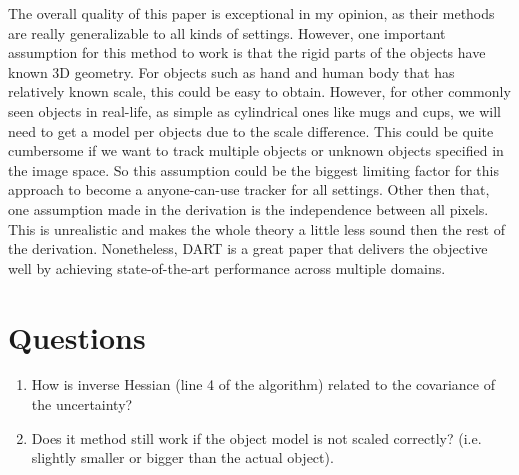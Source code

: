 \documentclass[10pt, twocolumn]{article}
\begin{document}
The overall quality of this paper is exceptional in my opinion, as their methods
are really generalizable to all kinds of settings. However, one important
assumption for this method to work is that the rigid parts of the objects have
known 3D geometry. For objects such as hand and human body that has relatively
known scale, this could be easy to obtain. However, for other commonly seen
objects in real-life, as simple as cylindrical ones like mugs and cups, we will
need to get a model per objects due to the scale difference. This could be
quite cumbersome if we want to track multiple objects or unknown objects
specified in the image space. So this assumption could be the biggest limiting
factor for this approach to become a anyone-can-use tracker for all settings.
Other then that, one assumption made in the derivation is the independence
between all pixels. This is unrealistic and makes the whole theory a little
less sound then the rest of the derivation. Nonetheless, DART is a great
paper that delivers the objective well by achieving state-of-the-art performance
across multiple domains.

\section{Questions}
\begin{enumerate}
  \item How is inverse Hessian (line 4 of the algorithm) related to the
    covariance of the uncertainty?

  \item Does it method still work if the object model is not scaled correctly?
    (i.e. slightly smaller or bigger than the actual object).
\end{enumerate}
\end{document}

